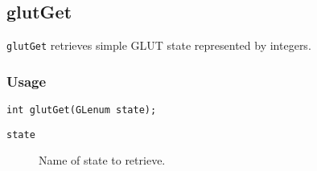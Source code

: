\subsection{glutGet}

{\tt glutGet} retrieves simple GLUT state represented by integers.

\subsubsection*{Usage}
\begin{verbatim}
int glutGet(GLenum state);
\end{verbatim}
\begin{description}
\item[\tt state]  Name of state to retrieve.
\itemsep 0in
\end{description}

